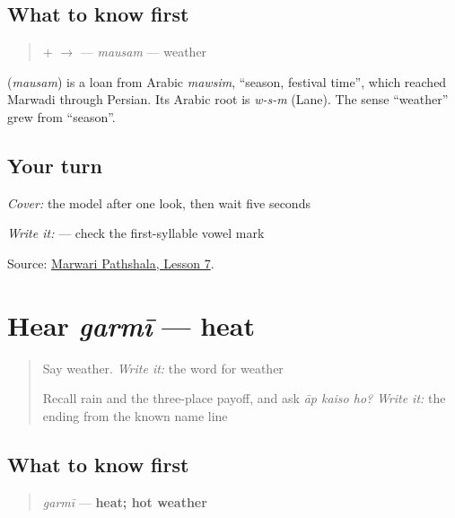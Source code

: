 \subsection*{What to know first}
\begin{quote}
\textbf{} + \textbf{} $\to$ \textbf{} — \emph{mausam} — weather
\end{quote}

\begin{cousinweb}
\textbf{} (\emph{mausam}) is a loan from Arabic \emph{mawsim}, \textquotedblleft{}season, festival time\textquotedblright{}, which reached Marwadi through Persian. Its Arabic root is \emph{w-s-m} (Lane). The sense \textquotedblleft{}weather\textquotedblright{} grew from \textquotedblleft{}season\textquotedblright{}.
\end{cousinweb}

\subsection*{Your turn}
\emph{Cover:} the model after one look, then wait five seconds

\emph{Write it:} \textbf{} — check the first-syllable vowel mark

\begin{tcolorbox}[breakable,colback=teal!4,colframe=teal!35!black,title={Before you move on}]
Source: \href{https://www.marwaripathshala.com/marwari-lesson-7-english}{Marwari Pathshala, Lesson 7}.
\end{tcolorbox}
\section[garmī]{Hear \emph{garmī} — heat}

\label{lesson:MW-C12-hear-garmi}



\begin{quote}
Say weather. \emph{Write it:} the word for weather

Recall rain and the three-place payoff, and ask \emph{āp kaiso ho?} \emph{Write it:} the \textbf{} ending from the known name line
\end{quote}

\subsection*{What to know first}
\begin{quote}
\emph{garmī} — \textbf{heat; hot weather}
\end{quote}

